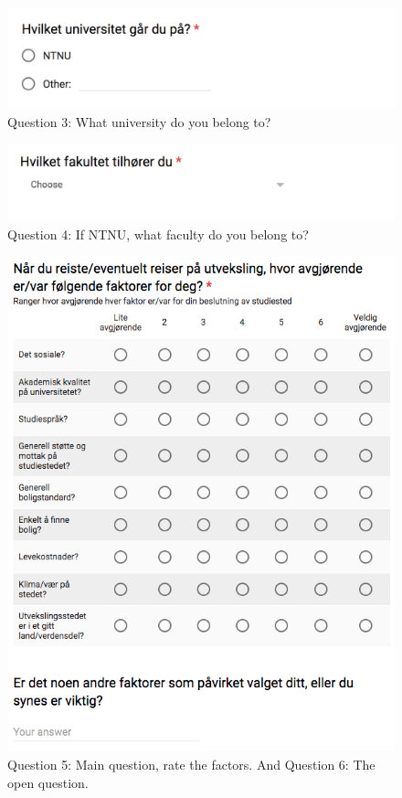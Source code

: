 \begin{figure}[h]
    \centering
\includegraphics[width=1\textwidth]{fig/form1/uni.png}
    \caption[]{Question 3: What university do you belong to?}
    \label{fig:q14}
\end{figure}

\begin{figure}[h]
    \centering
    
\includegraphics[width=1\textwidth]{fig/form1/faculty.png}
    \caption[]{Question 4: If NTNU, what faculty do you belong to?}
    \label{fig:q15}
\end{figure}

\begin{figure}[h]
    \centering
    
\includegraphics[width=1\textwidth]{fig/form1/main.png}
    \caption[]{Question 5: Main question, rate the factors. And Question 6: The open question.}
    \label{fig:q16}
\end{figure}



